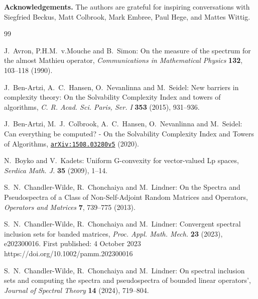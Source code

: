 \documentclass{article}
\newcommand\Marko[1]{\marginpar{\textcolor{blue}{\tt #1}}}
\numberwithin{equation}{section}   %
\numberwithin{figure}{section}  %
\begin{document}
\medskip

{\bf Acknowledgements.} The authors are grateful for inspiring conversations with Siegfried Beckus, Matt Colbrook, Mark Embree, Paul Hege, and Mattes Wittig.


\begin{thebibliography}{99}

{\sc J.~Avron, P.H.M.~v.Mouche} and {\sc B.~Simon}:
On the measure of the spectrum for the almost Mathieu operator,
{\it Communications in Mathematical Physics} {\bf 132}, 103--118 (1990).

{\sc J.~Ben-Artzi, A.~C.~Hansen, O.~Nevanlinna} and {\sc M.~Seidel}:
New barriers in complexity theory: On the Solvability Complexity Index and towers of algorithms,
{\it C. R. Acad. Sci. Paris, Ser. I} {\bf 353} (2015), 931--936.

{\sc J.~Ben-Artzi, M.~J.~Colbrook, A.~C.~Hansen, O.~Nevanlinna} and {\sc M.~Seidel}:
Can everything be computed? - On the Solvability Complexity Index and Towers of Algorithms,
{\tt \href{https://arxiv.org/abs/1508.03280v5}{arXiv:1508.03280v5}} (2020).


%
%

{\sc N.~Boyko} and {\sc V.~Kadets}:
Uniform G-convexity for vector-valued Lp spaces, 
{\it Serdica Math. J.} {\bf 35} (2009), 1--14.

{\sc S.~N.~Chandler-Wilde, R.~Chonchaiya} and {\sc M.~Lindner:}
On the Spectra and Pseudospectra of a Class of Non-Self-Adjoint Random Matrices and Operators,
{\it Operators and Matrices} {\bf 7}, 739--775 (2013).


{\sc S.~N.~Chandler-Wilde, R.~Chonchaiya} and {\sc M.~Lindner:}
Convergent spectral inclusion sets for banded matrices, {\it Proc. Appl. Math. Mech.} {\bf 23} (2023), e202300016.
First published: 4 October 2023 https://doi.org/10.1002/pamm.202300016

{\sc S.~N.~Chandler-Wilde, R.~Chonchaiya} and {\sc M.~Lindner:}
On spectral inclusion sets and computing the spectra and pseudospectra of bounded linear operators',
{\it Journal of Spectral Theory} {\bf 14} (2024), 719--804.


\end{thebibliography}
\end{document}
